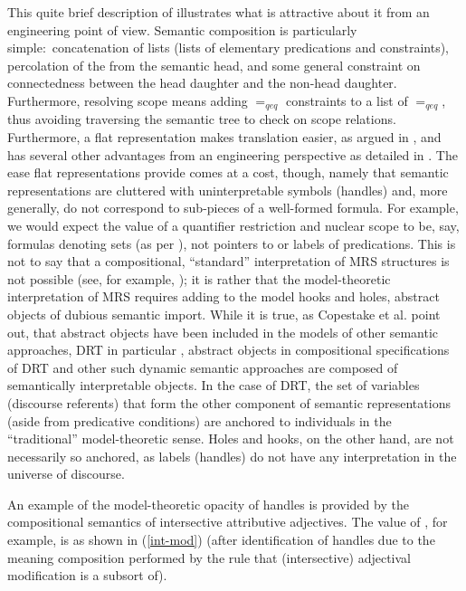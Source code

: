 \documentclass[output=paper
	        ,collection
	        ,collectionchapter
 	        ,biblatex
                ,babelshorthands
                ,newtxmath
                ,draftmode
                ,colorlinks, citecolor=brown
]{langscibook}
\begin{document}
This quite brief description of  illustrates what is attractive about it from an engineering point of view. Semantic composition is particularly simple:\ concatenation of lists (lists of elementary predications and constraints), percolation of the  from the semantic head, and some general constraint on connectedness between the head daughter and the non-head daughter. Furthermore, resolving scope means adding $=_{qeq}$ constraints to a list of $=_{qeq}$, thus avoiding traversing the semantic tree to check on scope relations. Furthermore, a flat representation makes translation easier, as argued in \citet{Copestakeetal1995}, and has several other advantages from an engineering perspective as detailed in \citet{Copestake2009}. The ease flat representations provide comes at a cost, though, namely that semantic representations are cluttered with uninterpretable symbols (handles) and, more generally, do not correspond to sub-pieces of a well-formed formula. For example, we would expect the value of a quantifier restriction and nuclear scope to be, say, formulas denoting sets (as per \citealt{BarwiseandCooper1981}), not pointers to or labels of predications. This is not to say that a compositional, ``standard'' interpretation of MRS structures is not possible (see, for example, \citealt{Copestakeetal2001}); it is rather that the model-theoretic interpretation of MRS requires adding to the model hooks and holes, abstract objects of dubious semantic import. While it is true, as Copestake et al. point out, that abstract objects have been included in the models of other semantic approaches, DRT in particular \citep{Zeevat1989}, abstract objects in compositional specifications of DRT and other such dynamic semantic approaches are composed of semantically interpretable objects. In the case of DRT, the set of variables (discourse referents) that form the other component of semantic representations (aside from predicative conditions) are anchored to individuals in the ``traditional'' model-theoretic sense. Holes and hooks, on the other hand, are not necessarily so anchored, as labels (handles) do not have any interpretation in the universe of discourse.


An example of the model-theoretic opacity of handles is provided by the compositional semantics of intersective attributive adjectives. The  value of , for example, is as shown in (\ref{int-mod}) (after identification of handles due to the meaning composition performed by the  rule that (intersective) adjectival modification is a subsort of).
\end{document}
